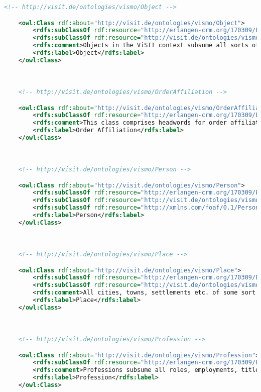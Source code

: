 \begin{lstlisting}[caption={VisMo Ontologie in der letzten (englischen) Version.},label={lst:vismo},captionpos=b,language=xml]
    <!-- http://visit.de/ontologies/vismo/Object -->

    <owl:Class rdf:about="http://visit.de/ontologies/vismo/Object">
        <rdfs:subClassOf rdf:resource="http://erlangen-crm.org/170309/E84_Information_Carrier"/>
        <rdfs:subClassOf rdf:resource="http://visit.de/ontologies/vismo/Resource"/>
        <rdfs:comment>Objects in the ViSIT context subsume all sorts of items that are displayed in a museum.</rdfs:comment>
        <rdfs:label>Object</rdfs:label>
    </owl:Class>
    


    <!-- http://visit.de/ontologies/vismo/OrderAffiliation -->

    <owl:Class rdf:about="http://visit.de/ontologies/vismo/OrderAffiliation">
        <rdfs:subClassOf rdf:resource="http://erlangen-crm.org/170309/E55_Type"/>
        <rdfs:comment>This class comprises headwords for order affiliations for vismo:Architecture resources.</rdfs:comment>
        <rdfs:label>Order Affiliation</rdfs:label>
    </owl:Class>
    


    <!-- http://visit.de/ontologies/vismo/Person -->

    <owl:Class rdf:about="http://visit.de/ontologies/vismo/Person">
        <rdfs:subClassOf rdf:resource="http://erlangen-crm.org/170309/E21_Person"/>
        <rdfs:subClassOf rdf:resource="http://visit.de/ontologies/vismo/Resource"/>
        <rdfs:subClassOf rdf:resource="http://xmlns.com/foaf/0.1/Person"/>
        <rdfs:label>Person</rdfs:label>
    </owl:Class>
    


    <!-- http://visit.de/ontologies/vismo/Place -->

    <owl:Class rdf:about="http://visit.de/ontologies/vismo/Place">
        <rdfs:subClassOf rdf:resource="http://erlangen-crm.org/170309/E53_Place"/>
        <rdfs:subClassOf rdf:resource="http://visit.de/ontologies/vismo/Resource"/>
        <rdfs:comment>All cities, towns, settlements etc. of some sort are subsumed under this class.</rdfs:comment>
        <rdfs:label>Place</rdfs:label>
    </owl:Class>
    


    <!-- http://visit.de/ontologies/vismo/Profession -->

    <owl:Class rdf:about="http://visit.de/ontologies/vismo/Profession">
        <rdfs:subClassOf rdf:resource="http://erlangen-crm.org/170309/E55_Type"/>
        <rdfs:comment>Professions subsume all roles, employments, titles, authorities, etc. for persons that are inherent in the cultural heritage domain.</rdfs:comment>
        <rdfs:label>Profession</rdfs:label>
    </owl:Class>
    



\end{lstlisting}

